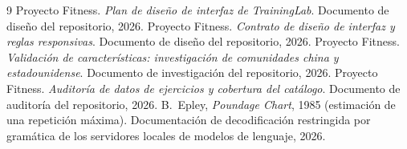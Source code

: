 \documentclass[conference]{IEEEtran}
\begin{document}
\begin{thebibliography}{9}
 Proyecto Fitness. \emph{Plan de dise\~no de interfaz de
TrainingLab}. Documento de dise\~no del repositorio, 2026.
 Proyecto Fitness. \emph{Contrato de dise\~no de interfaz y
reglas responsivas}. Documento de dise\~no del repositorio, 2026.
 Proyecto Fitness. \emph{Validaci\'on de caracter\'isticas:
investigaci\'on de comunidades china y estadounidense}. Documento de
investigaci\'on del repositorio, 2026.
 Proyecto Fitness. \emph{Auditor\'ia de datos de ejercicios y
cobertura del cat\'alogo}. Documento de auditor\'ia del repositorio, 2026.
 B.~Epley, \emph{Poundage Chart}, 1985 (estimaci\'on de una
repetici\'on m\'axima).
 Documentaci\'on de decodificaci\'on restringida por gram\'atica
de los servidores locales de modelos de lenguaje, 2026.
\end{thebibliography}
\end{document}
